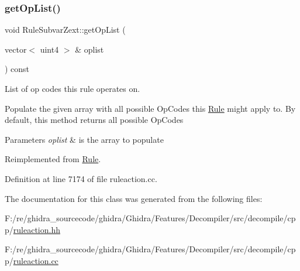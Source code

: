 \subsubsection{\texorpdfstring{getOpList()}{getOpList()}}
{\footnotesize\ttfamily void Rule\+Subvar\+Zext\+::get\+Op\+List (\begin{DoxyParamCaption}\item[{vector$<$ uint4 $>$ \&}]{oplist }\end{DoxyParamCaption}) const\hspace{0.3cm}{\ttfamily [virtual]}}



List of op codes this rule operates on. 

Populate the given array with all possible Op\+Codes this \mbox{\hyperlink{class_rule}{Rule}} might apply to. By default, this method returns all possible Op\+Codes 
\begin{DoxyParams}{Parameters}
{\em oplist} & is the array to populate \\
\hline
\end{DoxyParams}


Reimplemented from \mbox{\hyperlink{class_rule_a4023bfc7825de0ab866790551856d10e}{Rule}}.



Definition at line 7174 of file ruleaction.\+cc.



The documentation for this class was generated from the following files\+:\begin{DoxyCompactItemize}
\item 
F\+:/re/ghidra\+\_\+sourcecode/ghidra/\+Ghidra/\+Features/\+Decompiler/src/decompile/cpp/\mbox{\hyperlink{ruleaction_8hh}{ruleaction.\+hh}}\item 
F\+:/re/ghidra\+\_\+sourcecode/ghidra/\+Ghidra/\+Features/\+Decompiler/src/decompile/cpp/\mbox{\hyperlink{ruleaction_8cc}{ruleaction.\+cc}}\end{DoxyCompactItemize}
